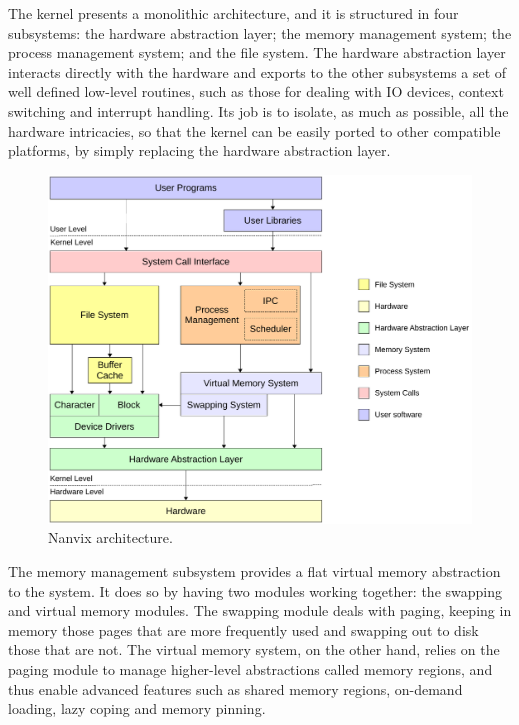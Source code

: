 \documentclass[10pt,a4paper]{article}
\begin{document}
The kernel presents a monolithic architecture, and it is structured in four subsystems: the hardware abstraction layer; the memory management system; the process management system; and the file system. The hardware abstraction layer interacts directly with the hardware and exports to the other subsystems a set of well defined low-level routines, such as those for dealing with IO devices, context switching and interrupt handling. Its job is to isolate, as much as possible, all the hardware intricacies, so that the kernel can be easily ported to other compatible platforms, by simply replacing the hardware abstraction layer.

\begin{figure}[t]
	\centering
	\includegraphics[scale=0.61]{img/nanvix-architecture}
	\caption{Nanvix architecture.}
	\label{figure: nanvix architecture}
\end{figure}

The memory management subsystem provides a flat virtual memory abstraction to the system. It does so by having two modules working together: the swapping and virtual memory modules. The swapping module deals with paging, keeping in memory those pages that are more frequently used and swapping out to disk those that are not. The virtual memory system, on the other hand, relies on the paging module to manage higher-level abstractions called memory regions, and thus enable advanced features such as shared memory regions, on-demand loading, lazy coping and memory pinning.
\end{document}
